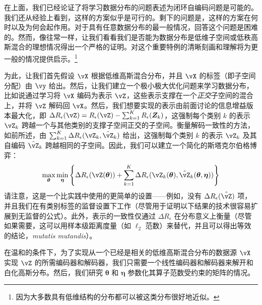 \documentclass[../../book-main_zh.tex]{subfiles}
\begin{document}
在上面，我们已经论证了将学习数据分布的问题表述为闭环自编码问题是可能的。我们还从经验上看到，这样的方案似乎是可行的。剩下的问题是，这样的方案在何时以及为何会起作用。对于具有任意数据分布的最一般情况，回答这个问题是困难的。然而，像往常一样，让我们看看我们是否能为数据分布是低维子空间或低秩高斯混合的理想情况得出一个严格的证明。对这个重要特例的清晰刻画和理解将为更一般的情况提供启示。\footnote{因为大多数具有低维结构的分布都可以被这类分布很好地近似。}

为此，让我们首先假设 \(\vX\) 根据低维高斯混合分布，并且 \(\vX\) 的标签（即子空间分配）由 \(\vy\) 给出。然后，让我们建立一个极小极大优化问题来学习数据分布，比如说通过学习将 \(\vX\) 编码为表示 \(\vZ\)，这些表示支撑在一个\textit{正交}子空间的混合上，并将 \(\vZ\) 解码回 \(\vX\)。然后，我们想要实现的表示由前面讨论的信息增益版本最大化，即 \( \Delta R_{\epsilon}(\vZ) = R_{\epsilon}(\vZ) - \sum_{k=1}^K R_{\epsilon}(\bm Z_k) \)，这强制每个类别 \(k\) 的表示 \(\vZ_{k}\) 跨越一个与其他类别的支撑子空间正交的子空间。衡量解码一致性的方法，如前所述，由 \(\sum_{k = 1}^{K}\Delta R_\epsilon(\vZ_{k}, \hat{\vZ}_{k})\) 给出，这强制每个类别 \(k\) 的表示 \(\vZ_{k}\) 及其自编码 \(\hat{\vZ}_{k}\) 跨越相同的子空间。因此，我们可以建立一个简化的斯塔克尔伯格博弈：
\begin{equation}\label{eq:ctrl_msp_game}
    \max_{\bm \theta}\min_{\bm \eta}\bc{\Delta R_\epsilon(\vZ(\bm \theta)) + \sum_{k = 1}^{K}\Delta R_\epsilon(\vZ_{k}(\bm \theta), \hat{\vZ}_{k}(\bm \theta, \bm \eta))}
\end{equation}
请注意，这是一个比实践中使用的更简单的设置——例如，没有 \(\Delta R_\epsilon(\hat{\vZ})\) 项，并且我们在有类别标签的监督设置下工作（尽管用于证明以下结果的技术很容易扩展到无监督的公式）。此外，表示的一致性仅通过 \(\Delta R_\epsilon\) 在分布意义上衡量（尽管如果需要，这可以用样本级距离度量（如 \(\ell_{2}\) 范数）来替代，并且可以得出等效的结论，\textit{mutatis mutandis}）。

在温和的条件下，为了实现从一个已经是相关的低维高斯混合分布的数据源 \(\vX\) 实现 \(\vZ\) 的所需编码器和解码器，我们只需要一个线性编码器和解码器来解开和白化高斯分布。然后，我们研究 \(\bm \theta\) 和 \(\bm \eta\) 参数化其算子范数受约束的矩阵的情况。
\end{document}
